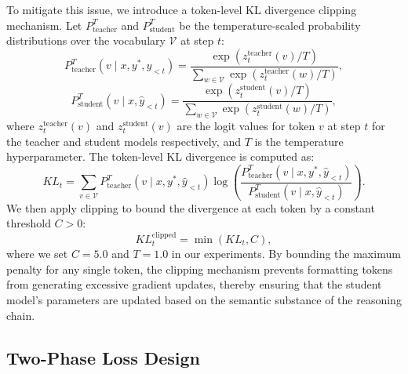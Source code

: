 To mitigate this issue, we introduce a token-level KL divergence clipping mechanism. Let $P_{\text{teacher}}^T$ and $P_{\text{student}}^T$ be the temperature-scaled probability distributions over the vocabulary $\mathcal{V}$ at step $t$:
\begin{equation}
    P_{\text{teacher}}^T(v \mid x, y^*, \hat{y}_{<t}) = \frac{\exp\left(z_t^{\text{teacher}}(v) / T\right)}{\sum_{w \in \mathcal{V}} \exp\left(z_t^{\text{teacher}}(w) / T\right)},
\end{equation}
\begin{equation}
    P_{\text{student}}^T(v \mid x, \hat{y}_{<t}) = \frac{\exp\left(z_t^{\text{student}}(v) / T\right)}{\sum_{w \in \mathcal{V}} \exp\left(z_t^{\text{student}}(w) / T\right)},
\end{equation}
where $z_t^{\text{teacher}}(v)$ and $z_t^{\text{student}}(v)$ are the logit values for token $v$ at step $t$ for the teacher and student models respectively, and $T$ is the temperature hyperparameter. The token-level KL divergence is computed as:
\begin{equation}
    KL_t = \sum_{v \in \mathcal{V}} P_{\text{teacher}}^T(v \mid x, y^*, \hat{y}_{<t}) \log \left( \frac{P_{\text{teacher}}^T(v \mid x, y^*, \hat{y}_{<t})}{P_{\text{student}}^T(v \mid x, \hat{y}_{<t})} \right).
\end{equation}
We then apply clipping to bound the divergence at each token by a constant threshold $C > 0$:
\begin{equation}
    KL_t^{\text{clipped}} = \min(KL_t, C),
\end{equation}
where we set $C = 5.0$ and $T = 1.0$ in our experiments. By bounding the maximum penalty for any single token, the clipping mechanism prevents formatting tokens from generating excessive gradient updates, thereby ensuring that the student model's parameters are updated based on the semantic substance of the reasoning chain.

\subsection{Two-Phase Loss Design}

